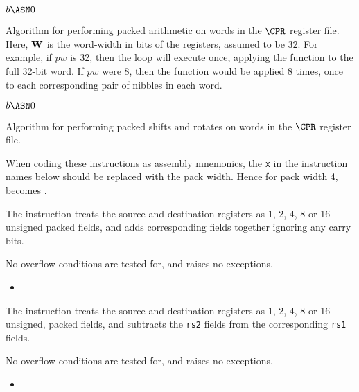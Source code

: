 \begin{algorithm}
    $b   \ASN 0 $\;
\caption{Algorithm for performing packed arithmetic on words in the 
$\CPR$ register file. Here, ${\bf W}$ is the word-width in bits of the
registers, assumed to be $32$. For example, if $pw$ is 32, then the loop
will execute once, applying the function to the full 32-bit word. If $pw$
were $8$, then the function would be applied $8$ times, once to each
corresponding pair of nibbles in each word.}
\end{algorithm}

\begin{algorithm}
    $b   \ASN 0 $\;
\caption{Algorithm for performing packed shifts and rotates on words in the 
$\CPR$ register file.}
\end{algorithm}

When coding these instructions as assembly mnemonics, the {\tt x} in the
instruction names below should be replaced with the pack width. Hence
for pack width 4,  becomes .

{\iencaddpx}
{
The instruction  treats the source and destination registers as
1, 2, 4, 8 or 16 unsigned packed fields, and adds corresponding fields
together ignoring any carry bits.

No overflow conditions are tested for, and  raises no exceptions.
}{
\begin{itemize}
\item {}
\end{itemize}
}{}


{\iencsubpx}
{
The instruction  treats the source and destination registers as
1, 2, 4, 8 or 16 unsigned, packed fields, and subtracts the {\tt rs2} fields
from the corresponding {\tt rs1} fields.

No overflow conditions are tested for, and  raises no exceptions.
}{
\begin{itemize}
\item {}
\end{itemize}
}{}


